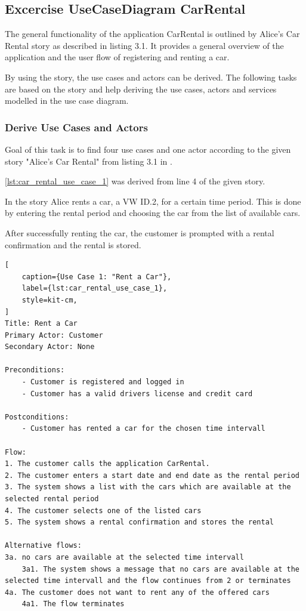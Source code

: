 \subsection{Excercise UseCaseDiagram CarRental}
\label{sec:exercise_use_case_diagram_car_rental}
The general functionality of the application CarRental is outlined by Alice's Car Rental story as described in \cite{CM-T-GO} listing 3.1.
It provides a general overview of the application and the user flow of registering and renting a car.

By using the story, the use cases and actors can be derived.
The following tasks are based on the story and help deriving the use cases, actors and services modelled in the use case diagram.

\subsubsection*{Derive Use Cases and Actors}
Goal of this task is to find four use cases and one actor according to the given story "Alice's Car Rental" from listing 3.1 in \cite{CM-T-GO}.

\autoref{lst:car_rental_use_case_1} was derived from line 4 of the given story.

In the story Alice rents a car, a VW ID.2, for a certain time period.
This is done by entering the rental period and choosing the car from the list of available cars.

After successfully renting the car, the customer is prompted with a rental confirmation and the rental is stored.

\begin{lstlisting}[
    caption={Use Case 1: "Rent a Car"},
    label={lst:car_rental_use_case_1},
    style=kit-cm,
]
Title: Rent a Car
Primary Actor: Customer
Secondary Actor: None

Preconditions:
    - Customer is registered and logged in
    - Customer has a valid drivers license and credit card

Postconditions:
    - Customer has rented a car for the chosen time intervall

Flow:
1. The customer calls the application CarRental.
2. The customer enters a start date and end date as the rental period
3. The system shows a list with the cars which are available at the selected rental period
4. The customer selects one of the listed cars
5. The system shows a rental confirmation and stores the rental

Alternative flows:
3a. no cars are available at the selected time intervall
    3a1. The system shows a message that no cars are available at the selected time intervall and the flow continues from 2 or terminates
4a. The customer does not want to rent any of the offered cars
    4a1. The flow terminates    
\end{lstlisting}

